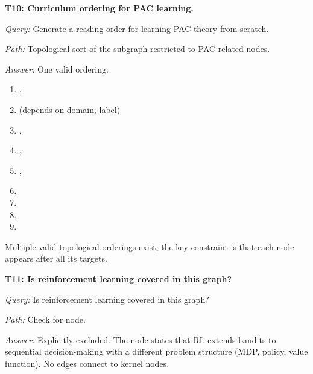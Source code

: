 \begin{traversal}
\textbf{T10: Curriculum ordering for PAC learning.}\par\medskip
\emph{Query:} Generate a reading order for learning PAC theory from scratch.\par
\emph{Path:} Topological sort of the  subgraph restricted to PAC-related nodes.\par
\emph{Answer:} One valid ordering:\par
\begin{enumerate}[leftmargin=2em, nosep]
  \item {}, 
  \item {} (depends on domain, label)
  \item {}, 
  \item {}, 
  \item {}, 
  \item {}
  \item {}
  \item {}
  \item {}
\end{enumerate}
Multiple valid topological orderings exist; the key constraint is that each node appears after all its  targets.
\end{traversal}

\begin{traversal}
\textbf{T11: Is reinforcement learning covered in this graph?}\par\medskip
\emph{Query:} Is reinforcement learning covered in this graph?\par
\emph{Path:} Check for  node.\par
\emph{Answer:} Explicitly excluded. The node  states that RL extends bandits to sequential decision-making with a different problem structure (MDP, policy, value function). No edges connect to kernel nodes.
\end{traversal}


